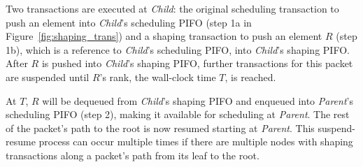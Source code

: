 Two transactions are executed at {\em Child}: the original scheduling
transaction to push an element into {\em Child}'s scheduling PIFO (step 1a in
Figure~\ref{fig:shaping_trans}) and a shaping transaction to push an element
$R$ (step 1b), which is a reference to {\em Child}'s scheduling PIFO, into {\em
Child}'s shaping PIFO. After $R$ is pushed into {\em Child}'s shaping PIFO,
further transactions for this packet are suspended until $R$'s rank, the
wall-clock time $T$, is reached.

At $T$, $R$ will be dequeued from {\em Child}'s shaping PIFO and enqueued into
{\em Parent}'s scheduling PIFO (step 2), making it available for scheduling at
{\em Parent}. The rest of the packet's path to the root is now resumed starting
at {\em Parent}. This suspend-resume process can occur multiple times if there
are multiple nodes with shaping transactions along a packet's path from its
leaf to the root.

